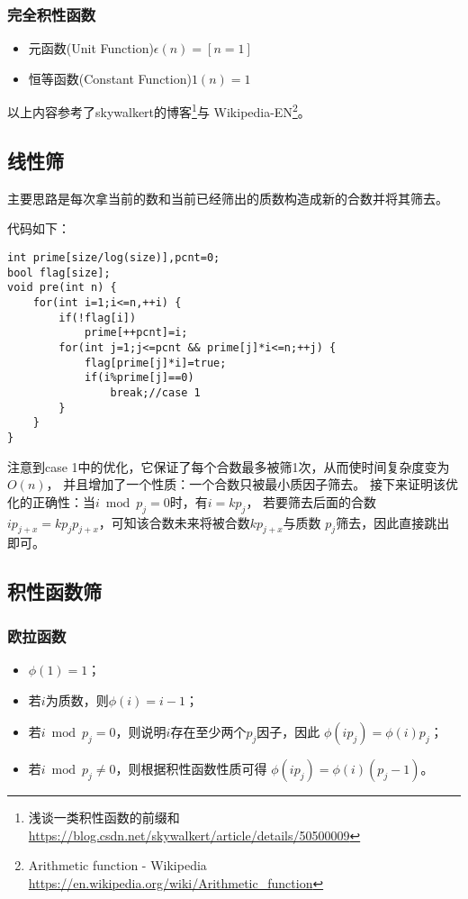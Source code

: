 \subsubsection{完全积性函数}
\begin{itemize}
	\item {}
	      元函数(Unit Function)$\epsilon(n)=[n=1]$
	\item {}
	      恒等函数(Constant Function)$1(n)=1$
\end{itemize}
以上内容参考了skywalkert的博客\footnote{浅谈一类积性函数的前缀和\\
	\url{https://blog.csdn.net/skywalkert/article/details/50500009}}与
Wikipedia-EN\footnote{Arithmetic function - Wikipedia
	\url{https://en.wikipedia.org/wiki/Arithmetic\_function}}。
\subsection{线性筛}
主要思路是每次拿当前的数和当前已经筛出的质数构造成新的合数并将其筛去。

代码如下：
\begin{lstlisting}[title=Euler]
int prime[size/log(size)],pcnt=0;
bool flag[size];
void pre(int n) {
    for(int i=1;i<=n,++i) {
        if(!flag[i])
            prime[++pcnt]=i;
        for(int j=1;j<=pcnt && prime[j]*i<=n;++j) {
            flag[prime[j]*i]=true;
            if(i%prime[j]==0)
                break;//case 1
        }
    }
}
\end{lstlisting}
注意到case 1中的优化，它保证了每个合数最多被筛1次，从而使时间复杂度变为$O(n)$，
并且增加了一个性质：一个合数只被最小质因子筛去。
接下来证明该优化的正确性：当$i\bmod p_j=0$时，有$i=kp_j$，
若要筛去后面的合数$ip_{j+x}=kp_jp_{j+x}$，可知该合数未来将被合数$kp_{j+x}$与质数
$p_j$筛去，因此直接跳出即可。
\subsection{积性函数筛}
\subsubsection{欧拉函数}
\begin{itemize}
	\item $\phi(1)=1$；
	\item 若$i$为质数，则$\phi(i)=i-1$；
	\item 若$i \bmod p_j=0$，则说明$i$存在至少两个$p_j$因子，因此
	      $\phi(ip_j)=\phi(i)p_j$；
	\item 若$i \bmod p_j\neq 0$，则根据积性函数性质可得
	      $\phi(ip_j)=\phi(i)(p_j-1)$。
\end{itemize}
